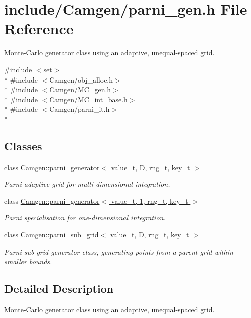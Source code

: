 \hypertarget{a00707}{}\section{include/\+Camgen/parni\+\_\+gen.h File Reference}
\label{a00707}


Monte-\/\+Carlo generator class using an adaptive, unequal-\/spaced grid.  


{\ttfamily \#include $<$set$>$}\\*
{\ttfamily \#include $<$Camgen/obj\+\_\+alloc.\+h$>$}\\*
{\ttfamily \#include $<$Camgen/\+M\+C\+\_\+gen.\+h$>$}\\*
{\ttfamily \#include $<$Camgen/\+M\+C\+\_\+int\+\_\+base.\+h$>$}\\*
{\ttfamily \#include $<$Camgen/parni\+\_\+it.\+h$>$}\\*
\subsection*{Classes}
\begin{DoxyCompactItemize}
\item 
class \hyperlink{a00393}{Camgen\+::parni\+\_\+generator$<$ value\+\_\+t, D, rng\+\_\+t, key\+\_\+t $>$}
\begin{DoxyCompactList}\small\item\em Parni adaptive grid for multi-\/dimensional integration. \end{DoxyCompactList}\item 
class \hyperlink{a00394}{Camgen\+::parni\+\_\+generator$<$ value\+\_\+t, 1, rng\+\_\+t, key\+\_\+t $>$}
\begin{DoxyCompactList}\small\item\em Parni specialisation for one-\/dimensional integration. \end{DoxyCompactList}\item 
class \hyperlink{a00397}{Camgen\+::parni\+\_\+sub\+\_\+grid$<$ value\+\_\+t, D, rng\+\_\+t, key\+\_\+t $>$}
\begin{DoxyCompactList}\small\item\em Parni sub grid generator class, generating points from a parent grid within smaller bounds. \end{DoxyCompactList}\end{DoxyCompactItemize}


\subsection{Detailed Description}
Monte-\/\+Carlo generator class using an adaptive, unequal-\/spaced grid. 


